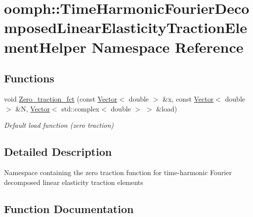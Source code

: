 \hypertarget{namespaceoomph_1_1TimeHarmonicFourierDecomposedLinearElasticityTractionElementHelper}{}\section{oomph\+:\+:Time\+Harmonic\+Fourier\+Decomposed\+Linear\+Elasticity\+Traction\+Element\+Helper Namespace Reference}
\label{namespaceoomph_1_1TimeHarmonicFourierDecomposedLinearElasticityTractionElementHelper}
\subsection*{Functions}
\begin{DoxyCompactItemize}
\item 
void \hyperlink{namespaceoomph_1_1TimeHarmonicFourierDecomposedLinearElasticityTractionElementHelper_aa88332ffc4fda33e69898534dd8374ed}{Zero\+\_\+traction\+\_\+fct} (const \hyperlink{classoomph_1_1Vector}{Vector}$<$ double $>$ \&x, const \hyperlink{classoomph_1_1Vector}{Vector}$<$ double $>$ \&N, \hyperlink{classoomph_1_1Vector}{Vector}$<$ std\+::complex$<$ double $>$ $>$ \&load)
\begin{DoxyCompactList}\small\item\em Default load function (zero traction) \end{DoxyCompactList}\end{DoxyCompactItemize}


\subsection{Detailed Description}
Namespace containing the zero traction function for time-\/harmonic Fourier decomposed linear elasticity traction elements 

\subsection{Function Documentation}
\mbox{\label{namespaceoomph_1_1TimeHarmonicFourierDecomposedLinearElasticityTractionElementHelper_aa88332ffc4fda33e69898534dd8374ed}} 
